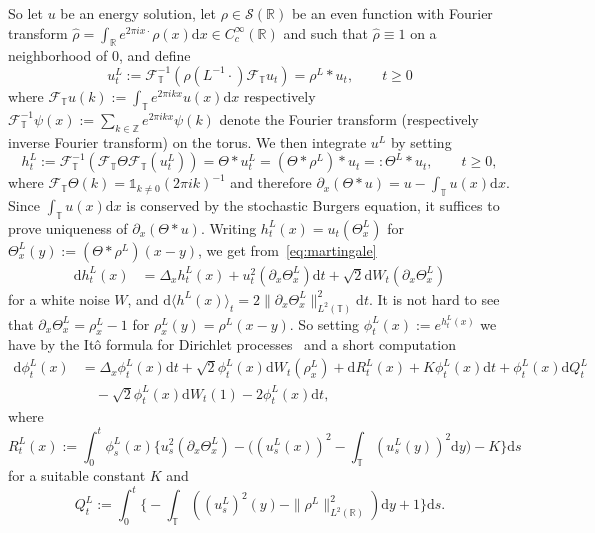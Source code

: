 \documentclass[a4paper,11pt]{article}
\newcommand{\assign}{:=}
\newcommand{\CS}{\mathscr{S}}
\newcommand{\CF}{\mathscr{F}}
\newcommand{\R}{\mathbb{R}}
\newcommand{\Z}{\mathbb{Z}}
\newcommand{\T}{\mathbb{T}}
\newcommand{\1}{\mathds{1}}
\newcommand{\dd}{\mathrm{d}}
\begin{document}
So let $u$ be an energy solution, let $\rho \in \CS (\mathbb{R})$ be an even function with Fourier transform $\hat{\rho} = \int_\R e^{2 \pi i x \cdot} \rho(x) \dd x \in C^\infty_c (\mathbb{R})$ and such that $\hat{\rho} \equiv 1$ on a neighborhood of $0$, and define
\begin{equation}\label{eq:uL-def-periodic}
   u^L_t \assign \CF^{-1}_\T(\hat{\rho}(L^{-1}\cdot) \CF_\T u_t ) = \rho^L \ast u_t, \qquad t \geqslant 0
\end{equation}
where $\CF_\T u(k) \assign \int_\T e^{2 \pi i k x} u(x) \dd x$ respectively $\CF^{-1}_\T \psi(x) \assign \sum_{k \in \Z} e^{2\pi i k x} \psi(k)$ denote the Fourier transform (respectively inverse Fourier transform) on the torus. We then integrate $u^L$ by setting
\[
   h^L_t \assign \CF^{-1}_\T (\CF_\T{\Theta} \CF_\T(u^L_t)) = \Theta \ast u^L_t = (\Theta \ast {\rho}^L) \ast u_t =: \Theta^L \ast u_t, \qquad t \geqslant 0,
\]
where $\CF_\T{\Theta}(k) = \1_{k \neq 0} (2\pi i k)^{-1}$ and therefore $\partial_x (\Theta \ast u) = u - \int_\T u(x) \dd x$. Since $\int_\T u(x) \dd x$ is conserved by the stochastic Burgers equation, it suffices to prove uniqueness of $\partial_x (\Theta \ast u)$. Writing $h^L_t(x) = u_t(\Theta^L_x)$ for $\Theta^L_x(y) \assign (\Theta \ast {\rho}^L)(x - y)$, we get from~\eqref{eq:martingale}
\begin{align*}
   \dd h^L_t (x) %
   & = \Delta_x h^L_t(x) + u^2_t (\partial_x \Theta^L_x) \dd t + \sqrt{2} \dd W_t (\partial_x \Theta^L_x)
\end{align*}
for a white noise $W$, and $\dd \langle h^L(x) \rangle_t = 2 \| \partial_x \Theta^L_x \|_{L^2(\T)}^2 \dd t$. It is not hard to see that $\partial_x \Theta^L_x = {\rho}^L_x - 1$ for ${\rho}^L_x(y) = {\rho}^L(x - y)$. So setting $\phi^L_t (x) \assign e^{ h^L_t (x)}$ we have by the It\^o formula for Dirichlet processes~\cite{RV} and a short computation
\begin{align*}
  \dd \phi^L_t (x) & = \Delta_x \phi^L_t (x) \dd t + \sqrt{2}  \phi^L_t (x) \dd W_t ({\rho}^L_x) +  \dd R^L_t(x) +  K \phi^L_t(x) \dd t + \phi^L_t(x) \dd Q^L_t \\
  &\quad - \sqrt{2}  \phi^L_t(x) \dd W_t(1) - 2 \phi^L_t(x) \dd t,
\end{align*}
where
\begin{equation}\label{eq:RL}
   R^L_t (x) \assign \int_0^t \phi^L_s (x) \Big\{u^2_s (\partial_x \Theta^L_x) - \Big((u_s^L (x))^2 - \int_\T (u_s^L (y))^2 \dd y\Big) - K \Big\} \dd s
\end{equation}
for a suitable constant $K$ and
\begin{equation}\label{eq:QL}
  Q^L_t \assign \int_0^t \Big\{ - \int_\T((u^L_s)^2(y) - \| {\rho}^L \|_{L^2(\R)}^2) \dd y + 1 \Big\} \dd s.
\end{equation}
\end{document}
